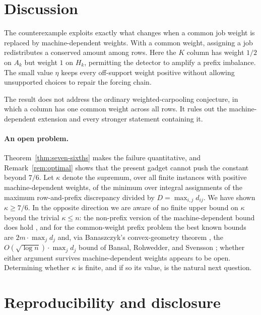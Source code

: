 \documentclass[11pt]{article}
\theoremstyle{definition}
\begin{document}
\section{Discussion}

The counterexample exploits exactly what changes when a common job weight is
replaced by machine-dependent weights.  With a common weight, assigning a job
redistributes a conserved amount among rows.  Here the $K$ column has weight
$1/2$ on $A_k$ but weight $1$ on $H_k$, permitting the detector to amplify a
prefix imbalance.  The small value $\eta$ keeps every off-support weight
positive without allowing unsupported choices to repair the forcing chain.

The result does not address the ordinary weighted-carpooling conjecture, in
which a column has one common weight across all rows.  It rules out the
machine-dependent extension and every stronger statement containing it.

\paragraph{An open problem.}
Theorem~\ref{thm:seven-sixths} makes the failure quantitative, and
Remark~\ref{rem:optimal} shows that the present gadget cannot push the
constant beyond $7/6$.  Let $\kappa$ denote the supremum, over all finite
instances with positive machine-dependent weights, of the minimum over
integral assignments of the maximum row-and-prefix discrepancy divided by
$D=\max_{i,j}d_{ij}$.  We have shown $\kappa\ge7/6$.  In the opposite
direction we are aware of no finite upper bound on $\kappa$ beyond the
trivial $\kappa\le n$: the non-prefix version of the machine-dependent bound
does hold \citep{LiuReis2026}, and for the common-weight prefix problem the
best known bounds are $2m\cdot\max_jd_j$ and, via Banaszczyk's convex-geometry
theorem \citep{Banaszczyk1998}, the $O(\sqrt{\log n})\cdot\max_jd_j$ bound of
Bansal, Rohwedder, and Svensson \citep{BansalRohwedderSvensson2022}; whether
either argument survives machine-dependent weights appears to be open.
Determining whether $\kappa$ is finite, and if so its value, is the natural
next question.

\section*{Reproducibility and disclosure}
\end{document}
